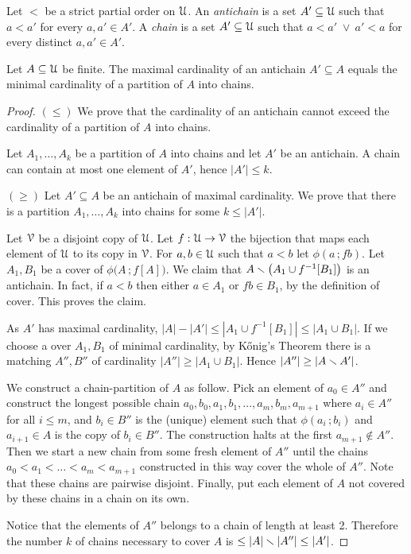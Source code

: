 \documentclass[scombinatorics.tex]{subfiles}
\begin{document}
Let $<$ be a strict partial order on $\EuScript U$.
An \emph{antichain\/} is a set $A'\subseteq\EuScript U$ such that $a<a'$ for every $a,a'\in A'$. A \emph{chain\/} is a set $A'\subseteq\EuScript U$ such that $a<a'\;\vee\ a'<a$ for every distinct $a,a'\in A'$.

\begin{void_thm}
  Let $A\subseteq\EuScript U$ be finite. 
  The maximal cardinality of an antichain $A'\subseteq A$ equals the minimal cardinality of a partition of $A$ into chains. 
\end{void_thm}

\begin{proof}
  {\boldmath$(\le)$}
  We prove that the cardinality of an antichain cannot exceed the cardinality of a partition of $A$ into chains.

  Let $A_1,\dots,A_k$ be a partition of $A$ into chains and let $A'$ be an antichain.
  A chain can contain at most one element of $A'$, hence $|A'|\le k$.

  {\boldmath$(\ge)$}  
  Let $A'\subseteq A$ be an antichain of maximal cardinality.
  We prove that there is a partition $A_1,\dots,A_k$ into chains for some $k\le|A'|$.


  Let $\EuScript V$ be a disjoint copy of $\EuScript U$.
  Let $f:\EuScript U\to\EuScript V$ the bijection that maps each element of $\EuScript U$ to its copy in $\EuScript V$.
  For $a,b\in\EuScript U$ such that $a<b$ let $\phi(a\,;fb)$.
  Let $A_1,B_1$ be a cover of $\phi\big(A\,;f[A]\big)$.
  We claim that $A \smallsetminus \big(A_1\cup f^{-1}[B_1]\big)$ is an antichain.
  In fact, if $a<b$ then either $a\in A_1$ or $fb\in B_1$, by the definition of cover.
  This proves the claim.

  As $A'$ has maximal cardinality, $|A| - |A'|\le |A_1\cup f^{-1}[B_1]|\le |A_1\cup B_1|$.
  If we choose a over $A_1,B_1$ of minimal cardinality, by K\H{o}nig's Theorem there is a matching $A'',B''$ of cardinality $|A''|\ge |A_1\cup B_1|$. Hence $|A''|\ge |A\smallsetminus A'|$.

  We construct a chain-partition of $A$ as follow.
  Pick an element of $a_0\in A''$ and construct the longest possible chain $a_0,b_0,a_1,b_1,\dots,a_m,b_m,a_{m+1}$ where $a_i\in A''$ for all $i\le m$, and $b_i\in B''$ is the (unique) element such that $\phi(a_i\,;b_i)$ and $a_{i+1}\in A$ is the copy of $b_i\in B''$.
  The construction halts at the first $a_{m+1}\not\in A''$.
  Then we start a new chain from some fresh element of $A''$ until the chains $a_0<a_1<\dots<a_m<a_{m+1}$ constructed in this way cover the whole of $A''$.
  Note that these chains are pairwise disjoint.
  Finally, put each element of $A$ not covered by these chains in a chain on its own.
  
  Notice that the elements of $A''$ belongs to a chain of length at least 2.
  Therefore the number $k$ of chains necessary to cover $A$ is $\le |A|\smallsetminus |A''| \le  |A'|$.
\end{proof}
\end{document}
